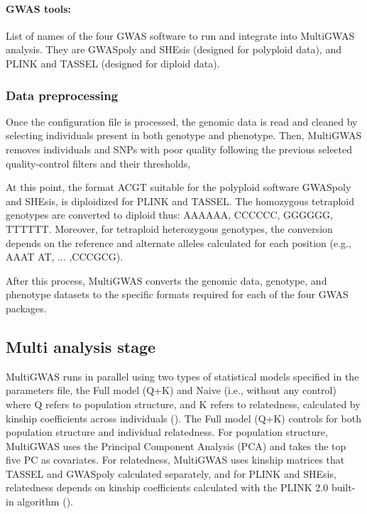 \documentclass{article}
\begin{document}
\paragraph{{GWAS tools:}}
List of names of the four GWAS software to run and integrate into MultiGWAS analysis. They are GWASpoly and SHEsis (designed for polyploid data), and PLINK and TASSEL (designed for diploid data). 

\subsubsection{Data preprocessing}

Once the configuration file is processed, the genomic data is read and cleaned by selecting individuals present in both genotype and phenotype. Then, MultiGWAS removes individuals and SNPs with poor quality following the previous selected quality-control filters and their thresholds, 

At this point, the format \textquotedbl{}ACGT\textquotedbl{} suitable for the polyploid software GWASpoly and SHEsis, is \textquotedbl{}diploidized\textquotedbl{} for PLINK and TASSEL. The homozygous tetraploid genotypes are converted to diploid thus: AAAA\textrightarrow AA, CCCC\textrightarrow CC, GGGG\textrightarrow GG, TTTT\textrightarrow TT. Moreover, for tetraploid heterozygous genotypes, the conversion depends on the reference and alternate alleles calculated for each position (e.g., AAAT \textrightarrow AT, ... ,CCCG\textrightarrow CG). 

After this process, MultiGWAS converts the genomic data, genotype, and phenotype datasets to the specific formats required for each of the four GWAS packages.

\subsection{Multi analysis stage}
MultiGWAS runs in parallel using two types of statistical models specified in the parameters file, the Full model (Q+K) and Naive (i.e., without any control) where Q refers to population structure, and K refers to relatedness, calculated by kinship coefficients across individuals (\cite{Sharma2018}). The Full model (Q+K) controls for both population structure and individual relatedness. For population structure, MultiGWAS uses the Principal Component Analysis (PCA) and takes the top five PC as covariates. For relatedness, MultiGWAS uses kinship matrices that TASSEL and GWASpoly calculated separately, and for PLINK and SHEsis, relatedness depends on kinship coefficients calculated with the PLINK 2.0 built-in algorithm (\cite{Chang2015}). 
\end{document}

